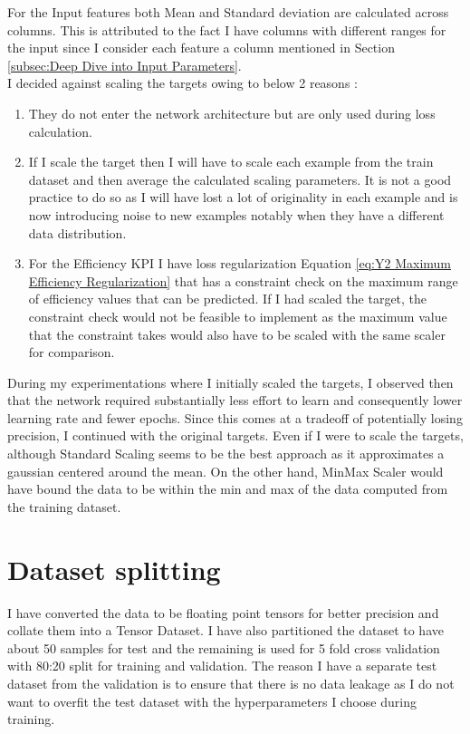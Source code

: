 \documentclass{report} %
\begin{document}
For the Input features both Mean and Standard deviation are calculated across columns. 
This is attributed to the fact I have columns with different ranges for the input since I consider each feature a column mentioned in 
Section \ref{subsec:Deep Dive into Input Parameters}.\\

I decided against scaling the targets owing to below 2 reasons :
\begin{enumerate}[nosep]
    \item They do not enter the network architecture but are only used during loss calculation.
    \item If I scale the target then I will have to scale each example from the train dataset and then average the calculated scaling parameters.
    It is not a good practice to do so as I will have lost a lot of originality in each example and is now introducing noise to new examples notably when they have a different data distribution.
    \item For the Efficiency \ac{KPI} I have loss regularization Equation \ref{eq:Y2 Maximum Efficiency Regularization} that has a constraint 
    check on the maximum range of efficiency values that can be predicted. If I had scaled the target, the constraint check would not be feasible to 
    implement as the maximum value that the constraint takes would also have to be scaled with the same scaler for comparison.\\
\end{enumerate}

During my experimentations where I initially scaled the targets, I observed then that the network required substantially less effort to learn and consequently lower learning rate and fewer epochs.
Since this comes at a tradeoff of potentially losing precision, I continued with the original targets.
Even if I were to scale the targets, although Standard Scaling seems to be the best approach as it approximates a gaussian centered around the mean.
On the other hand, MinMax Scaler would have bound the data to be within the min and max of the data computed from the training dataset.

\section{Dataset splitting}\label{sec:Dataset splitting}
I have converted the data to be floating point tensors for better precision and collate them into a Tensor Dataset.
I have also partitioned the dataset to have about 50 samples for test and the remaining is used for 5 fold cross validation with 80:20 split for training and validation. 
The reason I have a separate test dataset from the validation is to ensure that there is no data leakage as I do not want to 
overfit the test dataset with the hyperparameters I choose during training. \\
\end{document}
